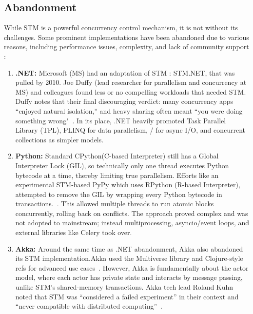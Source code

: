 \subsection{Abandonment}

While STM is a powerful concurrency control mechanism, it is not without its challenges. Some prominent implementations have been abandoned due to various reasons, including performance issues, complexity, and lack of community support :
\begin{enumerate}
    \item \textbf{.NET:}  Microsoft (MS) had an adaptation of STM :  STM.NET, that was pulled by 2010. Joe Duffy (lead researcher for parallelism and concurrency at MS) and colleagues found less or no compelling workloads that needed STM. Duffy notes that their final discouraging verdict: many concurrency apps “enjoyed natural isolation,” and heavy sharing often meant “you were doing something wrong"~\cite{infoq.com}.  In its place, .NET heavily promoted Task Parallel Library (TPL), PLINQ for data parallelism, / for async I/O, and concurrent collections as simpler models.
    \item \textbf{Python:}  Standard CPython(C-based Interpreter) still has a Global Interpreter Lock (GIL), so technically only one thread executes Python bytecode at a time, thereby limiting true parallelism. Efforts like an experimental STM-based PyPy which uses RPython (R-based Interpreter), attempted to remove the GIL by wrapping every Python bytecode in transactions.~\cite{pypy.org}. This allowed multiple threads to run atomic blocks concurrently, rolling back on conflicts. The approach proved complex and was not adopted to mainstream; instead multiprocessing, asyncio/event loops, and external libraries like Celery took over.
    \item \textbf{Akka:} Around the same time as .NET abandonment, Akka also abandoned its STM implementation.Akka used the Multiverse library and Clojure-style refs for advanced use cases~\cite{docs.akka.io}. 
    However, Akka is fundamentally about the actor model, where each actor has private state and interacts by message passing, unlike STM’s shared-memory transactions. Akka tech lead Roland Kuhn noted that STM was “considered a failed experiment” in their context and “never compatible with distributed computing”~\cite{groups.google.com}.
\end{enumerate}
